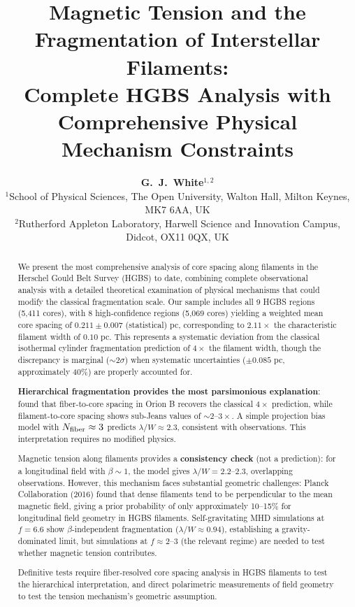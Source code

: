 \documentclass[11pt,a4paper]{article}
\title{\textbf{Magnetic Tension and the Fragmentation of Interstellar Filaments:\\
Complete HGBS Analysis with Comprehensive Physical Mechanism Constraints}}
\author{\textbf{G.~J.~White$^{1,2}$}\\
\small{$^{1}$School of Physical Sciences, The Open University, Walton Hall, Milton Keynes, MK7 6AA, UK}\\
\small{$^{2}$Rutherford Appleton Laboratory, Harwell Science and Innovation Campus, Didcot, OX11 0QX, UK}}
\begin{document}
\maketitle

\begin{abstract}
We present the most comprehensive analysis of core spacing along filaments in the Herschel Gould Belt Survey (HGBS) to date, combining complete observational analysis with a detailed theoretical examination of physical mechanisms that could modify the classical fragmentation scale. Our sample includes all 9 HGBS regions (5,411 cores), with 8 high-confidence regions (5,069 cores) yielding a weighted mean core spacing of $0.211 \pm 0.007$ (statistical) pc, corresponding to $2.11\times$ the characteristic filament width of $0.10$ pc. This represents a systematic deviation from the classical isothermal cylinder fragmentation prediction of $4\times$ the filament width, though the discrepancy is marginal ($\sim2\sigma$) when systematic uncertainties ($\pm0.085$ pc, approximately 40\%) are properly accounted for.

\textbf{Hierarchical fragmentation provides the most parsimonious explanation}: \citet{Yang2024} found that fiber-to-core spacing in Orion B recovers the classical $4\times$ prediction, while filament-to-core spacing shows sub-Jeans values of $\sim2$--$3\times$. A simple projection bias model with $N_{\rm fiber} \approx 3$ predicts $\lambda/W \approx 2.3$, consistent with observations. This interpretation requires no modified physics.

Magnetic tension along filaments provides a \textbf{consistency check} (not a prediction): for a longitudinal field with $\beta \sim 1$, the model gives $\lambda/W = 2.2$--$2.3$, overlapping observations. However, this mechanism faces substantial geometric challenges: Planck Collaboration (2016) found that dense filaments tend to be perpendicular to the mean magnetic field, giving a prior probability of only approximately 10--15\% for longitudinal field geometry in HGBS filaments. Self-gravitating MHD simulations at $f = 6.6$ show $\beta$-independent fragmentation ($\lambda/W \approx 0.94$), establishing a gravity-dominated limit, but simulations at $f \approx 2$--$3$ (the relevant regime) are needed to test whether magnetic tension contributes.

Definitive tests require fiber-resolved core spacing analysis in HGBS filaments to test the hierarchical interpretation, and direct polarimetric measurements of field geometry to test the tension mechanism's geometric assumption.
\end{abstract}
\end{document}
